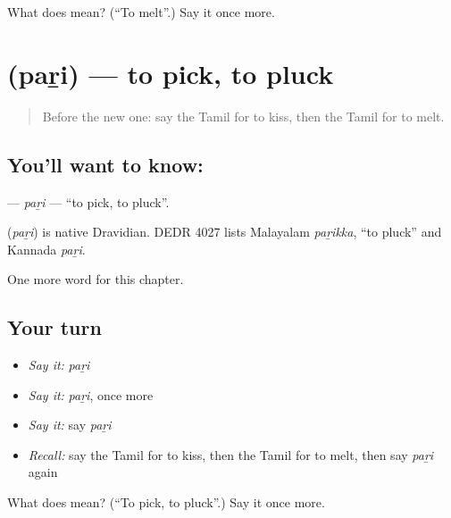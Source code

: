 \begin{tcolorbox}[breakable,colback=teal!4,colframe=teal!35!black,title={Before you move on}]
What does  mean? (\textquotedblleft{}To melt\textquotedblright{}.) Say it once more.
\end{tcolorbox}
\section[\texorpdfstring{\ta{பறி} (paṟi)}{பறி (paṟi)}]{ (paṟi) — to pick, to pluck}

\label{lesson:TA-C258-pari}



\begin{quote}
Before the new one: say the Tamil for to kiss, then the Tamil for to melt.
\end{quote}

\subsection*{You'll want to know: }
\textbf{} — \emph{paṟi} — \textquotedblleft{}to pick, to pluck\textquotedblright{}.

\begin{cousinweb}
\textbf{} (\emph{paṟi}) is native Dravidian. DEDR 4027 lists Malayalam \emph{paṟikka}, \textquotedblleft{}to pluck\textquotedblright{} and Kannada \emph{paṟi}.
\end{cousinweb}

\begin{grammarlens}[title={What you've built}]
One more word for this chapter.
\end{grammarlens}

\subsection*{Your turn}
\begin{itemize}
\raggedright
  \item \emph{Say it:} \emph{paṟi}
  \item \emph{Say it:} \emph{paṟi}, once more
  \item \emph{Say it:} say \emph{paṟi}
  \item \emph{Recall:} say the Tamil for to kiss, then the Tamil for to melt, then say \emph{paṟi} again
\end{itemize}

\begin{tcolorbox}[breakable,colback=teal!4,colframe=teal!35!black,title={Before you move on}]
What does  mean? (\textquotedblleft{}To pick, to pluck\textquotedblright{}.) Say it once more.
\end{tcolorbox}
